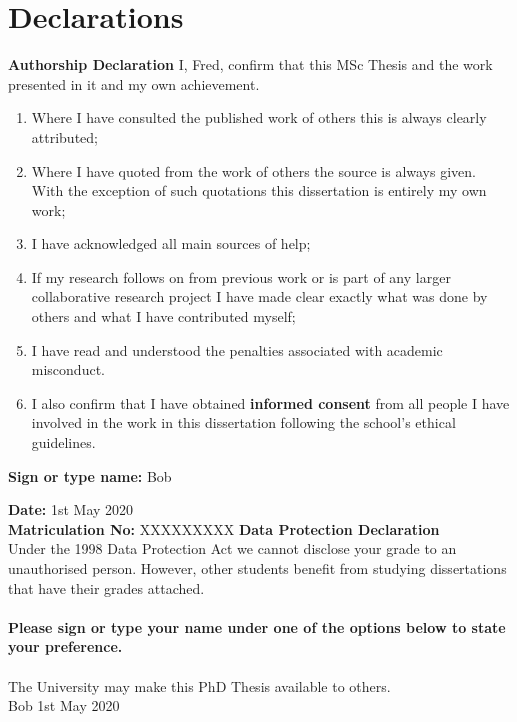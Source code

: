 \newpage
{}

\chapter*{Declarations}
\Large
\textbf{Authorship Declaration}
\normalsize
\newline
I, Fred, confirm that this MSc Thesis and the work presented in it and my own achievement.
\begin{enumerate}
    \item Where I have consulted the published work of others this is always clearly attributed;
    \item Where I have quoted from the work of others the source is always given. With the exception of such quotations this dissertation is entirely my own work;
    \item I have acknowledged all main sources of help;
    \item If my research follows on from previous work or is part of any larger collaborative research project I have made clear exactly what was done by others and what I have contributed myself;
    \item I have read and understood the penalties associated with academic misconduct.
    \item I also confirm that I have obtained \textbf{informed consent} from all people I have involved in the work in this dissertation following the school's ethical guidelines.\\
\end{enumerate}


\large

\textbf{Sign or type name:}	Bob 

\textbf{Date:} 1st May 2020\\

\textbf{Matriculation No:} XXXXXXXXX
\normalsize
\newpage
\large
\noindent\textbf{Data Protection Declaration}
\normalsize\\
Under the 1998 Data Protection Act we cannot disclose your grade to an unauthorised person. However, other students benefit from studying dissertations that have their grades attached.
\newline\\
\\
\textbf{Please sign or type your name under one of the options below to state your preference.}
\newline\\
\\
The University may make this PhD Thesis  available to others.
\\
\newline
\large
Bob		1st May 2020
\normalsize

